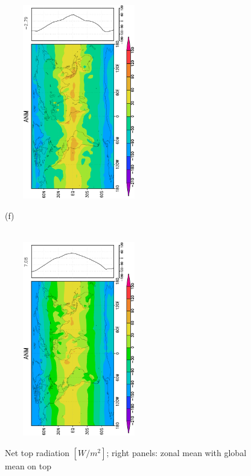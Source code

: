 \documentclass[12pt,a4paper,twoside,openright,headinclude,liststotoc,bibtotoc]{scrreprt}
\begin{document}
\begin{figure}[H]
{\includegraphics[height=8.5cm,width=6.5cm,angle=-90]
{eps/zonaltmnetrad.eps}
}
\parbox{8.5cm}{\hspace{0.50cm}\begin{scriptsize}(f)\end{scriptsize} \vspace{-0.7cm} \\
\includegraphics[height=8.5cm,width=6.5cm,angle=-90]
{eps/zonalt21tmnetrad.eps}
}
\caption[Net top radiation]{Net top radiation $[W/m^2]$; right panels: zonal mean with global mean on top}
\label{img:netrad}
\end{figure}
\end{document}
